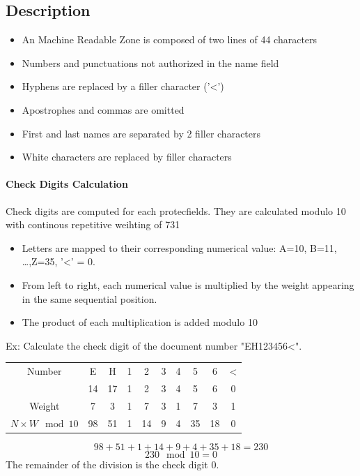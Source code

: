 
\subsection{Description}
\begin{itemize}
    \item An Machine Readable Zone is composed of two lines of 44 characters
    \item Numbers and punctuations not authorized in the name field
    \item Hyphens are replaced by a filler character ('<')
    \item Apostrophes and commas are omitted
    \item First and last names are separated by 2 filler characters
    \item White characters are replaced by filler characters
\end{itemize}

\paragraph{Check Digits Calculation}
Check digits are computed for each protecfields. They are calculated modulo 10
with continous repetitive weihting of 731
\begin{itemize}
    \item Letters are mapped to their corresponding numerical value:
    A=10, B=11, \ldots,Z=35, '<' = 0.
    \item From left to right, each numerical value is multiplied by the weight
    appearing in the same sequential position.
    \item The product of each multiplication is added modulo 10
\end{itemize}
Ex: Calculate the check digit of the document number "EH123456<".
\begin{table}[ht!]
    \centering
    \begin{tabular}{c|c|c|c|c|c|c|c|c|c|}
        Number & E & H & 1 & 2 & 3 & 4 & 5 & 6 & < \\
        & 14 & 17 & 1 & 2 & 3 & 4 & 5 & 6 & 0 \\
        \hline
        Weight & 7 & 3 & 1 & 7 & 3 & 1 & 7 & 3 & 1\\
        \hline
        $N\times W \mod{10}$ & 98 & 51 & 1 & 14 & 9 & 4 & 35 & 18 & 0\\
    \end{tabular}
\end{table}
$$ 98+51+1+14+9+4+35+18 = 230 $$
$$ 230 \mod 10 = 0 $$
The remainder of the division is the check digit 0.

